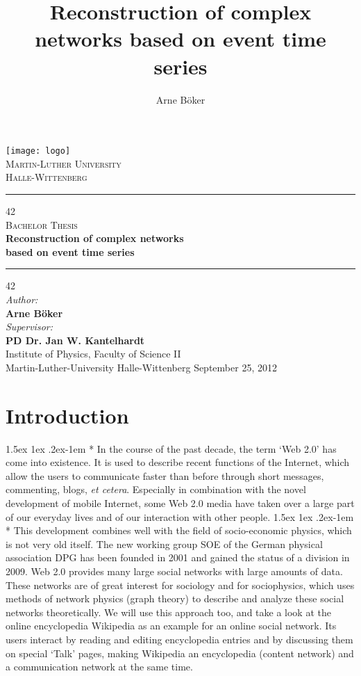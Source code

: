 \documentclass[a4paper,12pt,twoside]{article}
\author{Arne Böker}
\title{Reconstruction of complex networks based on event time series}
\makeatletter
\renewcommand{\paragraph}{%
  \@startsection{paragraph}{4}%
  {\z@}{1.5ex \@plus 1ex \@minus .2ex}{-1em}%
  {\normalfont\normalsize\bfseries}%
}
\newcommand{\blankpage}{ %
\newpage
\thispagestyle{empty}
\mbox{}
\newpage
}
\makeatother
\begin{document}
\begin{titlepage}
\centering
\texttt{[image: logo]}\\
\textsc{\Large Martin-Luther University \\Halle-Wittenberg}\\[1cm]
\hrule
{\color{white}42} \\[0.5cm]
\textsc{\huge Bachelor Thesis}\\[0.5cm]
{\huge \bf Reconstruction of complex networks\\[0.1cm] based on event time series}\\[1cm]
\hrule
{\color{white}42} \\[1cm]
\Large
\emph{Author:}\\
\textbf{Arne Böker}\\[0.5cm]
\emph{Supervisor:} \\
\textbf{PD Dr. Jan W. Kantelhardt}\\[0.5cm]
Institute of Physics, Faculty of Science II\\
Martin-Luther-University Halle-Wittenberg
\vfill
{\large September 25, 2012}
\end{titlepage}
\newpage
\blankpage
\thispagestyle{plain}
\tableofcontents
\newpage
\blankpage
%
\section{Introduction}
\paragraph*{} In the course of the past decade, the term `Web 2.0' has come into existence. It is used to describe recent functions of the Internet, which allow the users to communicate faster than before through short messages, commenting, blogs, \emph{et cetera}. Especially in combination with the novel development of mobile Internet, some Web 2.0 media have taken over a large part of our everyday lives and of our interaction with other people.
\paragraph*{} This development combines well with the field of socio-economic physics, which is not very old itself. The new working group SOE of the German physical association DPG has been founded in 2001 and gained the status of a division in 2009. Web 2.0 provides many large social networks with large amounts of data. These networks are of great interest for sociology and for sociophysics, which uses methods of network physics (graph theory) to describe and analyze these social networks theoretically. We will use this approach too, and take a look at the online encyclopedia Wikipedia as an example for an online social network. Its users interact by reading and editing encyclopedia entries and by discussing them on special `Talk' pages, making Wikipedia an encyclopedia (content network) and a communication network at the same time.
\end{document}
